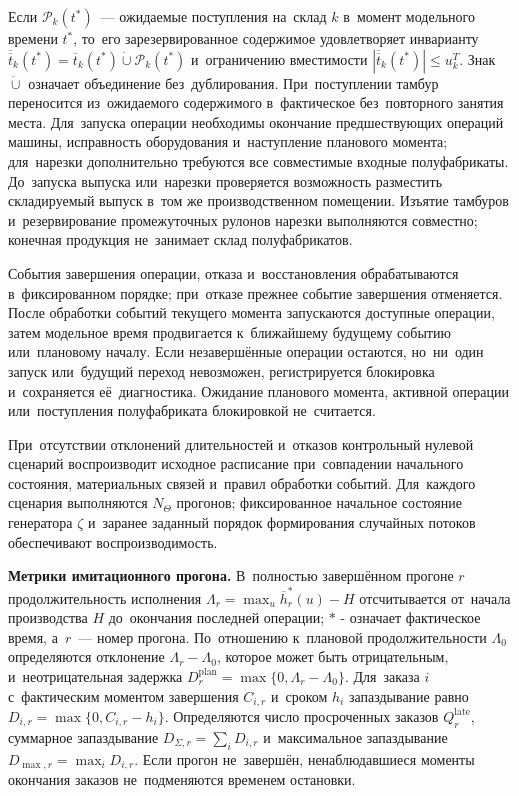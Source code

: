 Если $\mathcal P_k(t^*)$~--- ожидаемые поступления на~склад $k$ в~момент модельного времени $t^*$, то~его зарезервированное содержимое удовлетворяет инварианту $\overline{\overline{t}}_k(t^*)=\overline{t}_k(t^*)\mathbin{\dot\cup}\mathcal P_k(t^*)$ и~ограничению вместимости $|\overline{\overline{t}}_k(t^*)|\leq u^T_k$. Знак $\mathbin{\dot\cup}$ означает объединение без~дублирования. При~поступлении тамбур переносится из~ожидаемого содержимого в~фактическое без~повторного занятия места. Для~запуска операции необходимы окончание предшествующих операций машины, исправность оборудования и~наступление планового момента; для~нарезки дополнительно требуются все совместимые входные полуфабрикаты. До~запуска выпуска или~нарезки проверяется возможность разместить складируемый выпуск в~том же производственном помещении. Изъятие тамбуров и~резервирование промежуточных рулонов нарезки выполняются совместно; конечная продукция не~занимает склад полуфабрикатов.

События завершения операции, отказа и~восстановления обрабатываются в~фиксированном порядке; при~отказе прежнее событие завершения отменяется. После обработки событий текущего момента запускаются доступные операции, затем модельное время продвигается к~ближайшему будущему событию или~плановому началу. Если незавершённые операции остаются, но~ни~один запуск или~будущий переход невозможен, регистрируется блокировка и~сохраняется её~диагностика. Ожидание планового момента, активной операции или~поступления полуфабриката блокировкой не~считается.

При~отсутствии отклонений длительностей и~отказов контрольный нулевой сценарий воспроизводит исходное расписание при~совпадении начального состояния, материальных связей и~правил обработки событий. Для~каждого сценария выполняются $N_\Theta$ прогонов; фиксированное начальное состояние генератора $\zeta$ и~заранее заданный порядок формирования случайных потоков обеспечивают воспроизводимость.

\textbf{Метрики имитационного прогона.} В~полностью завершённом прогоне $r$ продолжительность исполнения $\Lambda_r=\max_u\overline h^{*}_r(u)-H$ отсчитывается от~начала производства $H$ до~окончания последней операции; $*$ - означает фактическое время, а~$r$~--- номер прогона. По~отношению к~плановой продолжительности $\Lambda_0$ определяются отклонение $\Lambda_r-\Lambda_0$, которое может быть отрицательным, и~неотрицательная задержка $D^{\mathrm{plan}}_r=\max\{0,\Lambda_r-\Lambda_0\}$. Для~заказа $i$ с~фактическим моментом завершения $C_{i,r}$ и~сроком $h_i$ запаздывание равно $D_{i,r}=\max\{0,C_{i,r}-h_i\}$. Определяются число просроченных заказов $Q^{\mathrm{late}}_r$, суммарное запаздывание $D_{\Sigma,r}=\sum_iD_{i,r}$ и~максимальное запаздывание $D_{\max,r}=\max_iD_{i,r}$. Если прогон не~завершён, ненаблюдавшиеся моменты окончания заказов не~подменяются временем остановки.

